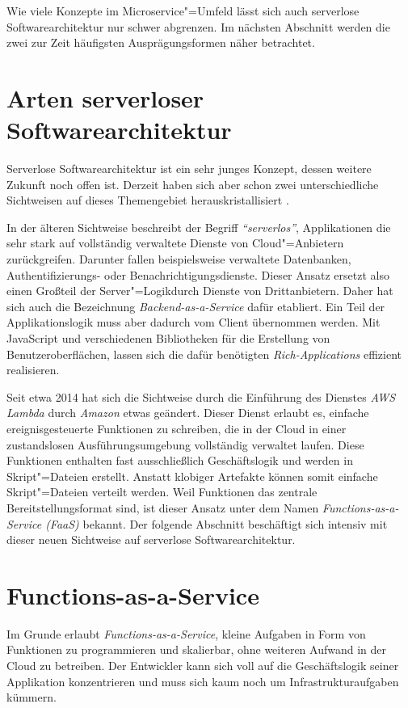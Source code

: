 Wie viele Konzepte im Microservice"=Umfeld lässt sich auch serverlose Softwarearchitektur nur schwer abgrenzen. Im nächsten Abschnitt werden die zwei zur Zeit häufigsten Ausprägungsformen näher betrachtet.

\section{Arten serverloser Softwarearchitektur}

Serverlose Softwarearchitektur ist ein sehr junges Konzept, dessen weitere Zukunft noch offen ist. Derzeit haben sich aber schon zwei unterschiedliche Sichtweisen auf dieses Themengebiet herauskristallisiert \cite{ServerlessArchitectures}.

In der älteren Sichtweise beschreibt der Begriff \textit{"`serverlos"'}, Applikationen die sehr stark auf vollständig verwaltete Dienste von Cloud"=Anbietern zurückgreifen. Darunter fallen beispielsweise verwaltete Datenbanken, Authentifizierungs- oder Benachrichtigungsdienste. Dieser Ansatz ersetzt also einen Großteil der Server"=Logikdurch Dienste von Drittanbietern. Daher hat sich auch die Bezeichnung \textit{Backend-as-a-Service} dafür etabliert. Ein Teil der Applikationslogik muss aber dadurch vom Client übernommen werden. Mit JavaScript und verschiedenen Bibliotheken für die Erstellung von Benutzeroberflächen, lassen sich die dafür benötigten \textit{Rich-Applications} effizient realisieren.

Seit etwa 2014 hat sich die Sichtweise durch die Einführung des Dienstes \textit{AWS Lambda} durch \textit{Amazon} etwas geändert. Dieser Dienst erlaubt es, einfache ereignisgesteuerte Funktionen zu schreiben, die in der Cloud in einer zustandslosen Ausführungsumgebung vollständig verwaltet laufen. Diese Funktionen enthalten fast ausschließlich Geschäftslogik und werden in Skript"=Dateien erstellt. Anstatt klobiger Artefakte können somit einfache Skript"=Dateien verteilt werden. Weil Funktionen das zentrale Bereitstellungsformat sind, ist dieser Ansatz unter dem Namen \textit{Functions-as-a-Service (FaaS)} bekannt. Der folgende Abschnitt beschäftigt sich intensiv mit dieser neuen Sichtweise auf serverlose Softwarearchitektur.

\section{Functions-as-a-Service}

Im Grunde erlaubt \textit{Functions-as-a-Service}, kleine Aufgaben in Form von Funktionen zu programmieren und skalierbar, ohne weiteren Aufwand in der Cloud zu betreiben. Der Entwickler kann sich voll auf die Geschäftslogik seiner Applikation konzentrieren und muss sich kaum noch um Infrastrukturaufgaben kümmern.

